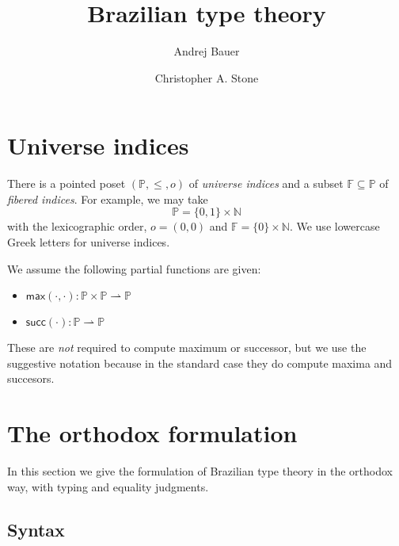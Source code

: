 \documentclass{article}
\newcommand{\NN}{\mathbb{N}} %
\newcommand{\PP}{\mathbb{P}} %
\newcommand{\FF}{\mathbb{F}} %
\newcommand{\zero}{o} %
\newcommand{\piClose}[2]{\mathsf{max}(#1,#2)}   %
\newcommand{\uClose}[1]{\mathsf{succ}(#1)}  %
\begin{document}
\title{Brazilian type theory}
\author{Andrej Bauer \and Christopher A. Stone}
\maketitle

\section{Universe indices}
\label{sec:universe-indices}

There is a pointed poset $(\PP, {\leq}, \zero)$ of \emph{universe
  indices} and a subset $\FF \subseteq \PP$ of \emph{fibered indices}.
For example, we may take
%
\begin{equation*}
  \PP = \{0,1\} \times \NN
\end{equation*}
%
with the lexicographic order, $\zero = (0,0)$ and $\FF = \{0\} \times
\NN$. We use lowercase Greek letters for universe indices.

We assume the following partial functions are given:
\begin{itemize}
  \item $\piClose{\cdot}{\cdot} : \PP \times \PP \rightharpoonup \PP$
  \item $\uClose{\cdot}  : \PP \rightharpoonup \PP$
\end{itemize}
%
These are \emph{not} required to compute maximum or successor, but we use the suggestive
notation because in the standard case they do compute maxima and succesors.

\section{The orthodox formulation}
\label{sec:orthodox-formulation}

In this section we give the formulation of Brazilian type theory in the orthodox way, with
typing and equality judgments.

\subsection{Syntax}
\label{sec:syntax}
\end{document}
